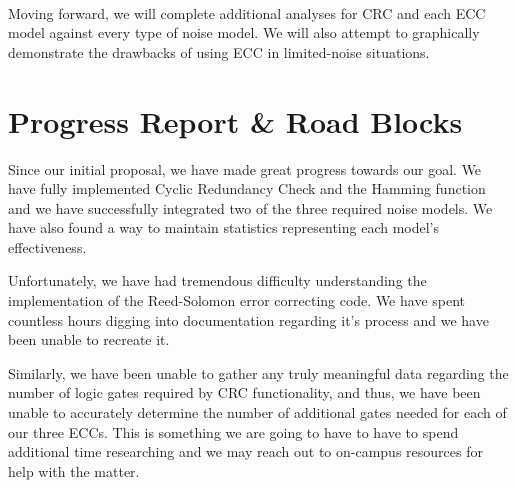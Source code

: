\documentclass{sigcomm-alternate}
\begin{document}
 \\

Moving forward, we will complete additional analyses for CRC and each ECC model against every type of noise model. We will also attempt to graphically demonstrate the drawbacks of using ECC in limited-noise situations.

\section{Progress Report \& Road Blocks}
Since our initial proposal, we have made great progress towards our goal. We have fully implemented Cyclic Redundancy Check and the Hamming function and we have successfully integrated two of the three required noise models. We have also found a way to maintain statistics representing each model's effectiveness.

Unfortunately, we have had tremendous difficulty understanding the implementation of the Reed-Solomon error correcting code. We have spent countless hours digging into documentation regarding it's process and we have been unable to recreate it.

Similarly, we have been unable to gather any truly meaningful data regarding the number of logic gates required by CRC functionality, and thus, we have been unable to accurately determine the number of additional gates needed for each of our three ECCs. This is something we are going to have to have to spend additional time researching and we may reach out to on-campus resources for help with the matter.
\end{document}
